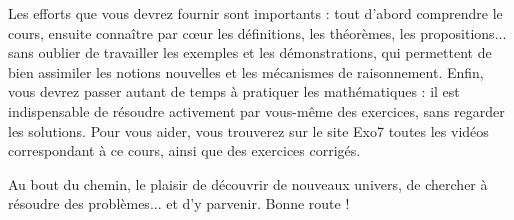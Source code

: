 \medskip

Les efforts que vous devrez fournir sont importants : tout d'abord comprendre le cours, 
ensuite connaître par c\oe ur les définitions, les théorèmes, les propositions... 
sans oublier de travailler les exemples et les démonstrations, qui permettent de 
bien assimiler les notions nouvelles et les mécanismes de raisonnement. Enfin, vous 
devrez passer autant de temps à pratiquer les mathématiques : il est indispensable 
de résoudre activement par vous-même des exercices, sans regarder les solutions.
Pour vous aider, vous trouverez sur le site Exo7 toutes les vidéos correspondant 
à ce cours, ainsi que des exercices corrigés.

Au bout du chemin, le plaisir de découvrir de nouveaux univers, 
de chercher à résoudre des problèmes... et d'y parvenir. Bonne route !

\vspace*{\fill}

\newpage
{}
\tableofcontents

